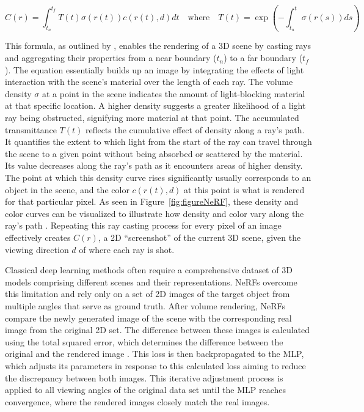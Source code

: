 \[ 
C(r) = \int_{t_n}^{t_f} T(t)\sigma(r(t))c(r(t), d)dt \quad \text{where} \quad T(t) = \exp\left(-\int_{t_n}^t \sigma(r(s))ds\right) 
\]

This formula, as outlined by \citeauthor{mildenhallNERF}, enables the rendering of a 3D scene by casting rays and aggregating their properties from a near boundary (\(t_n\)) to a far boundary (\(t_f\)). The equation essentially builds up an image by integrating the effects of light interaction with the scene's material over the length of each ray. The volume density \(\sigma\) at a point in the scene indicates the amount of light-blocking material at that specific location. A higher density suggests a greater likelihood of a light ray being obstructed, signifying more material at that point. The accumulated transmittance \( T(t) \) reflects the cumulative effect of density along a ray's path. It quantifies the extent to which light from the start of the ray can travel through the scene to a given point without being absorbed or scattered by the material. Its value decreases along the ray's path as it encounters areas of higher density. The point at which this density curve rises significantly usually corresponds to an object in the scene, and the color \( c(r(t), d) \) at this point is what is rendered for that particular pixel. As seen in Figure~\ref{fig:figureNeRF}, these density and color curves can be visualized to illustrate how density and color vary along the ray's path \citep{mildenhallNERF}. Repeating this ray casting process for every pixel of an image effectively creates \(C(r)\), a 2D ``screenshot'' of the current 3D scene, given the viewing direction \( d \) of where each ray is shot. 

Classical deep learning methods often require a comprehensive dataset of 3D models comprising different scenes and their representations. NeRFs overcome this limitation and rely only on a set of 2D images of the target object from multiple angles that serve as ground truth. After volume rendering, NeRFs compare the newly generated image of the scene with the corresponding real image from the original 2D set. The difference between these images is calculated using the total squared error, which determines the difference between the original and the rendered image \citep{mildenhallNERF}. This loss is then backpropagated to the MLP, which adjusts its parameters in response to this calculated loss aiming to reduce the discrepancy between both images. This iterative adjustment process is applied to all viewing angles of the original data set until the MLP reaches convergence, where the rendered images closely match the real images.

